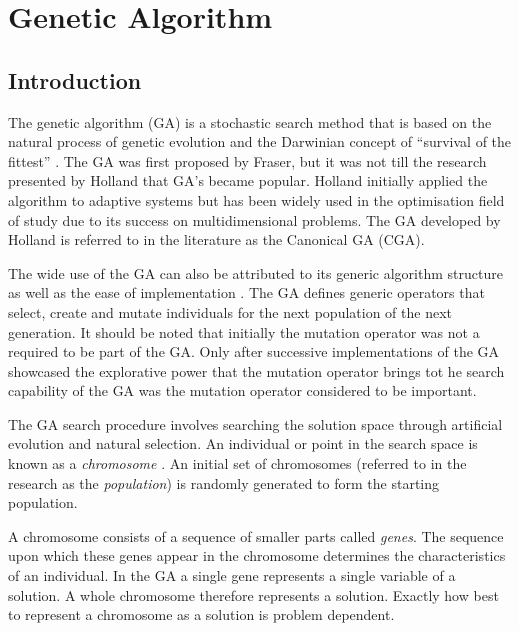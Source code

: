 \section{Genetic Algorithm}
\label{sec:geneticalgorithm}
\subsection{Introduction}
The genetic algorithm (GA) is a stochastic search method that is based on the natural process of genetic evolution and the Darwinian concept of ``survival of the fittest'' \cite{DistributedHierarchicalGA,AcceleratingGA,AdaptiveSAGA,FamilyGA}. The \gls{GA} was first proposed by Fraser, but it was not till the research presented by Holland that \gls{GA}'s became popular\cite{CompuIntelligenceIntro}. Holland initially applied the algorithm to adaptive systems but has been widely used in the optimisation field of study due to its success on multidimensional problems\cite{ParallelGASA,DistributedHierarchicalGA,FamilyGA}. The \gls{GA} developed by Holland is referred to in the literature as the Canonical \gls{GA} (CGA)\cite{CompuIntelligenceIntro}.

The wide use of the \gls{GA} can also be attributed to its generic algorithm structure as well as the ease of implementation \cite{FamilyGA,AdaptiveSAGA}. The \gls{GA} defines generic operators that select, create and mutate individuals for the next population of the next generation\cite{CompuIntelligenceIntro}. It should be noted that initially the mutation operator was not a required to be part of the \gls{GA}. Only after successive implementations of the \gls{GA} showcased the explorative power that the mutation operator brings tot he search capability of the \gls{GA} was the mutation operator considered to be important\cite{CompuIntelligenceIntro}. 


The \gls{GA} search procedure involves searching the solution space through artificial evolution and natural selection\cite{FamilyGA,MultiPopGA,HybridIntelliGA}. An individual or point in the search space is known as a \emph{chromosome} \cite{HumanPassiveGA}. An initial set of chromosomes (referred to in the research as the \emph{population}) is randomly generated to form the starting population\cite{FamilyGA,HybridIntelliGA,AcceleratingGA,MultiPopGA}. 

A chromosome consists of a sequence of smaller parts called \emph{genes}\cite{CompuIntelligenceIntro}. The sequence upon which these genes appear in the chromosome determines the characteristics of an individual\cite{CompuIntelligenceIntro}. In the \gls{GA} a single gene represents a single variable of a solution\cite{FamilyGA,AcceleratingGA}. A whole chromosome therefore represents a solution\cite{FamilyGA,AcceleratingGA}. Exactly how best to represent a chromosome as a solution is problem dependent\cite{CompuIntelligenceIntro}.

